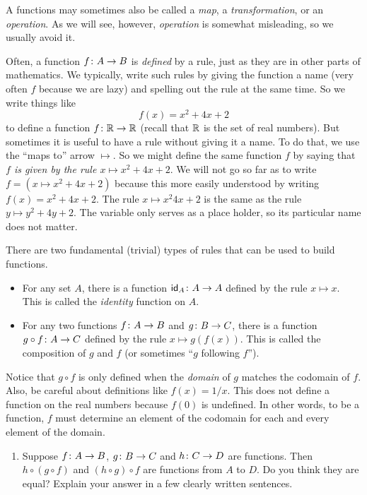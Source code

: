 A functions may sometimes also be called a \emph{map}, a \emph{transformation}, or an \emph{operation}. 
As we will see, however, \emph{operation} is somewhat misleading, so we usually avoid it. 

Often, a function ${f}\colon{A}\to{B}$ is \emph{defined} by a rule, just as they are in other parts of mathematics. 
We typically, write such rules by giving the function a name (very often $f$ because we are lazy) and spelling out the rule at the same time.
So we write things like
\[f(x)=x^2 + 4x + 2\]
to define a function ${f}\colon{\mathbb R}\to{\mathbb R}$ (recall that $\mathbb R$ is the set of real numbers).
But sometimes it is useful to have a rule without giving it a name.
To do that, we use the ``maps to'' arrow $\mapsto$.
So we might define the same function $f$ by saying that \emph{$f$ is given by the rule $x\mapsto x^2 + 4x + 2$}. 
We will not go so far as to write $f = (x\mapsto x^2+4x+2)$ because this more easily understood by writing $f(x)=x^2+4x+2$.
The rule $x\mapsto x^2  4x + 2$ is the same as the rule $y\mapsto y^2 + 4y + 2$. 
The variable only serves as a place holder, so its particular name does not matter.

There are two fundamental (trivial) types of rules that can be used to build functions.

\begin{principle}
	\begin{itemize}
		\item For any set $A$, there is a function ${\textsf{id}_A}\colon{A}\to{A}$ defined by the rule $x\mapsto x$.
		This is called the \emph{identity} function on $A$.
		\item For any two functions ${f}\colon{A}\to{B}$ and ${g}\colon{B}\to{C}$, there is a function ${g\circ f}\colon{A}\to{C}$ defined by the rule $x\mapsto g(f(x))$.
		This is called the composition of $g$ and $f$ (or sometimes ``$g$ following $f$'').
	\end{itemize}
\end{principle}

Notice that $g\circ f$ is only defined when the \emph{domain} of $g$ matches the codomain of $f$.
Also, be careful about definitions like $f(x)=1/x$.
This does not define a function on the real numbers because $f(0)$ is undefined.
In other words, to be a function, $f$ must determine an element of the codomain for each and every element of the domain.

\begin{exercises}
	\begin{enumerate}[resume=exercises]
\item Suppose ${f}\colon{A}\to{B}$, ${g}\colon{B}\to{C}$ and ${h}\colon{C}\to{D}$ are functions. Then $h\circ(g\circ f)$ and $(h\circ g)\circ f$ are functions
from $A$ to $D$. Do you think they are equal? Explain your answer in a few clearly written sentences.	
\end{enumerate}
\end{exercises}

